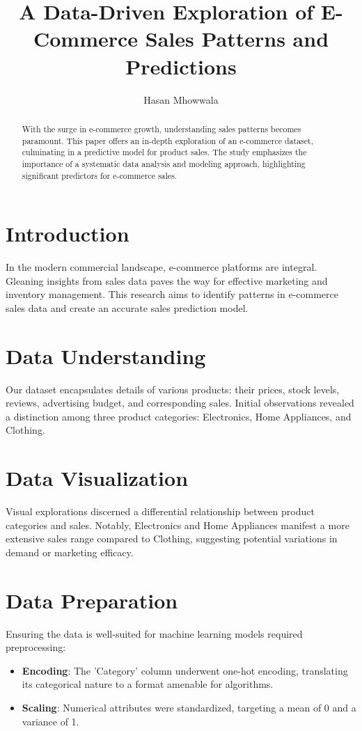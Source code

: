 \documentclass{article}
\title{A Data-Driven Exploration of E-Commerce Sales Patterns and Predictions}
\author[1]{Hasan Mhowwala}
\affil[1]{San Jose State University}
\begin{document}
\maketitle

\begin{abstract}
With the surge in e-commerce growth, understanding sales patterns becomes paramount. This paper offers an in-depth exploration of an e-commerce dataset, culminating in a predictive model for product sales. The study emphasizes the importance of a systematic data analysis and modeling approach, highlighting significant predictors for e-commerce sales.
\end{abstract}

\section{Introduction}
In the modern commercial landscape, e-commerce platforms are integral. Gleaning insights from sales data paves the way for effective marketing and inventory management. This research aims to identify patterns in e-commerce sales data and create an accurate sales prediction model.

\section{Data Understanding}
Our dataset encapsulates details of various products: their prices, stock levels, reviews, advertising budget, and corresponding sales. Initial observations revealed a distinction among three product categories: Electronics, Home Appliances, and Clothing.

\section{Data Visualization}
Visual explorations discerned a differential relationship between product categories and sales. Notably, Electronics and Home Appliances manifest a more extensive sales range compared to Clothing, suggesting potential variations in demand or marketing efficacy.

\section{Data Preparation}
Ensuring the data is well-suited for machine learning models required preprocessing:

\begin{itemize}
    \item \textbf{Encoding}: The 'Category' column underwent one-hot encoding, translating its categorical nature to a format amenable for algorithms.
    \item \textbf{Scaling}: Numerical attributes were standardized, targeting a mean of 0 and a variance of 1.
\end{itemize}
\end{document}
